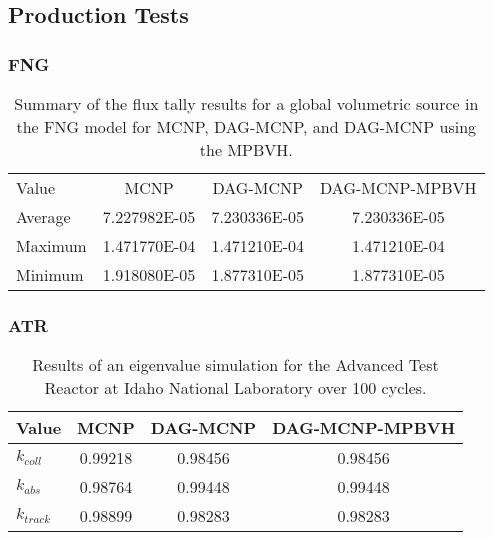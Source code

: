 \subsection{Production Tests}

\subsubsection{FNG}

  \begin{table}[H]
    \small
    \begin{center}
      \begin{tabular}{lccc}
        \toprule
        Value & MCNP & DAG-MCNP & DAG-MCNP-MPBVH \\
        Average & 7.227982E-05 & 7.230336E-05 & 7.230336E-05 \\
        Maximum & 1.471770E-04 & 1.471210E-04 & 1.471210E-04 \\
        Minimum & 1.918080E-05 & 1.877310E-05 & 1.877310E-05 \\
      \end{tabular}
    \end{center}
    \caption[Flux tally results in FNG for various DAG-MCNP
      implementations.]{Summary of the flux tally results for a global
      volumetric source in the FNG model for MCNP, DAG-MCNP, and DAG-MCNP using
      the MPBVH.}
  \end{table}

  \subsubsection{ATR}

  \begin{table}
    \small
    \begin{center}
      \begin{tabular}{lccc}
        \toprule
        Value & MCNP & DAG-MCNP & DAG-MCNP-MPBVH \\
        \toprule
        $k_{coll}$  & 0.99218 & 0.98456 & 0.98456  \\
        $k_{abs}$   & 0.98764 & 0.99448 & 0.99448  \\
        $k_{track}$ & 0.98899 & 0.98283 & 0.98283  \\
        \bottomrule
      \end{tabular}
    \end{center}
    \caption[Results of eigenvalue simulations in ATR for various DAG-MCNP
      implementations.]{Results of an eigenvalue simulation for the Advanced
      Test Reactor at Idaho National Laboratory over 100 cycles.}
  \end{table}

